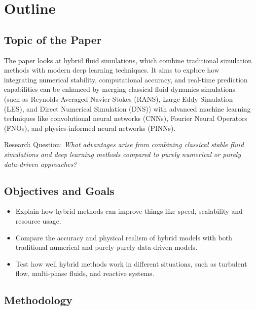 \section{Outline}\label{sec:Outline}
\subsection*{Topic of the Paper}
The paper looks at hybrid fluid simulations, which combine 
traditional simulation methods with modern deep learning techniques. 
It aims to 
explore how integrating numerical stability, computational accuracy, and real-time 
prediction capabilities can be enhanced by merging classical fluid dynamics 
simulations (such as Reynolds-Averaged Navier-Stokes (RANS), Large Eddy Simulation 
(LES), and Direct Numerical Simulation (DNS)) with advanced machine learning 
techniques like convolutional neural networks (CNNs), Fourier Neural Operators 
(FNOs), and physics-informed neural networks (PINNs).

Research Question:
\textit{What advantages arise from combining classical stable fluid simulations and deep 
learning methods compared to purely numerical or purely data-driven approaches?}

\subsection*{Objectives and Goals}
\begin{itemize}
    \item 
	Explain how hybrid methods can improve things like speed, 
    scalability and resource usage.

    \item 
    Compare the accuracy and physical realism of hybrid models with both 
    traditional numerical and purely purely data-driven models.

    \item 
	Test how well hybrid methods work in different situations, 
    such as turbulent flow, multi-phase fluids, and reactive systems.

\end{itemize}

\subsection*{Methodology}
